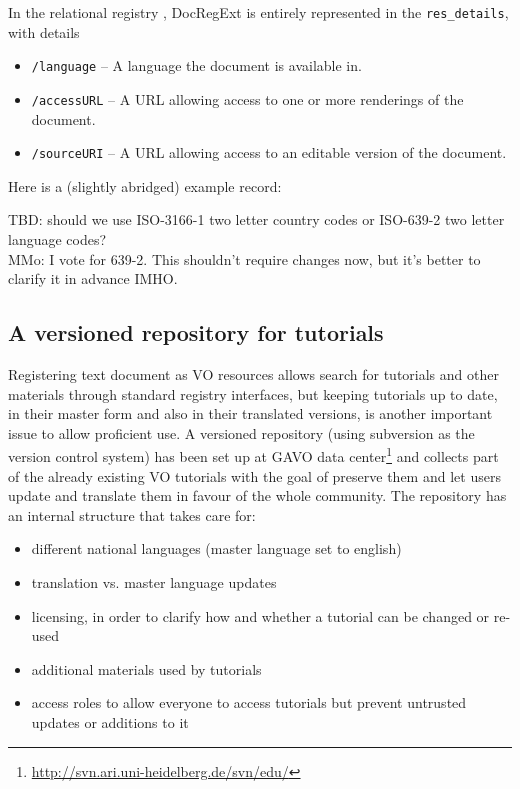 \documentclass{ivoa}
\begin{document}

In the relational registry \citep{2014ivoa.spec.1208D}, DocRegExt is
entirely represented in the \verb|res_details|, with details


\begin{itemize}

\item \texttt{/language} -- A language the document is available in.{}

\item \texttt{/accessURL} -- A URL allowing access to one or more
renderings of the document.{}

\item \texttt{/sourceURI} -- A URL allowing access to an editable version of the document.{}

\end{itemize}
Here is a (slightly abridged) example record:

TBD: should we use ISO-3166-1 two letter 
country codes or ISO-639-2 two letter language codes?\\
MMo: I vote for 639-2. This shouldn't require changes now, 
but it's better to clarify it in advance IMHO.


\subsection{A versioned repository for tutorials}

\label{sect:svn-repo}

Registering text document as VO resources allows search for tutorials and other 
materials through standard registry interfaces, but keeping 
tutorials up to date, in their master form and also in their translated 
versions, is another important issue to allow proficient use.
A versioned repository (using subversion as the version control system) 
has been set up at GAVO data
center\footnote{\url{http://svn.ari.uni-heidelberg.de/svn/edu/}} 
and collects part of the
already existing VO tutorials with the goal of preserve them and let users 
update and translate them in favour of the whole community.
The repository has an internal structure that takes care for:

\begin{itemize}

\item different national languages (master language set to english){}

\item translation vs. master language updates{}

\item licensing, in order to clarify how and whether a tutorial can be changed or re-used{}

\item additional materials used by tutorials{}

\item access roles to allow everyone to access tutorials but prevent untrusted updates or additions to it{}

\end{itemize}
\end{document}
